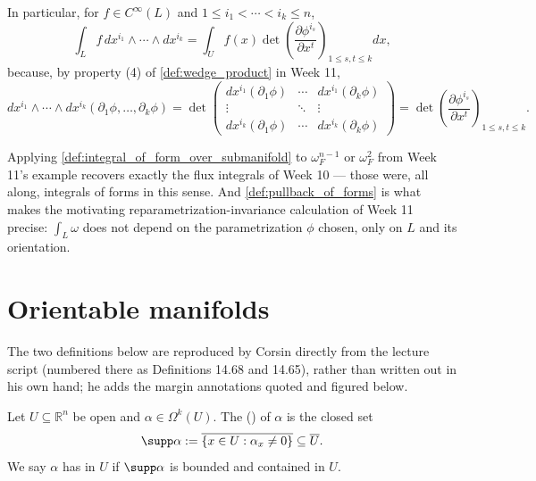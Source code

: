 In particular, for $f \in C^\infty(L)$ and $1\leq i_1<\cdots<i_k\leq n$,
\[\int_L f\,dx^{i_1}\wedge\cdots\wedge dx^{i_k} = \int_U f(x)\det\!\left(\frac{\partial
  \phi^{i_s}}{\partial x^t}\right)_{1\leq s,t\leq k} dx,\]
because, by property (4) of \cref{def:wedge_product} in Week 11,
\[dx^{i_1}\wedge\cdots\wedge dx^{i_k}(\partial_1\phi,\ldots,\partial_k\phi) = \det\!\left(
  \begin{smallmatrix} dx^{i_1}(\partial_1\phi) & \cdots & dx^{i_1}(\partial_k\phi) \\
  \vdots & \ddots & \vdots \\ dx^{i_k}(\partial_1\phi) & \cdots & dx^{i_k}(\partial_k\phi)
  \end{smallmatrix}\right) = \det\!\left(\frac{\partial\phi^{i_s}}{\partial x^t}\right)_{1\leq
  s,t\leq k}.\]

\begin{ainote}
Applying \cref{def:integral_of_form_over_submanifold} to $\omega_F^{n-1}$ or $\omega_F^2$ from
Week 11's example recovers exactly the flux integrals of Week 10 --- those were, all along,
integrals of forms in this sense. And \cref{def:pullback_of_forms} is what makes the
motivating reparametrization-invariance calculation of Week 11 precise: $\int_L \omega$ does
not depend on the parametrization $\phi$ chosen, only on $L$ and its orientation.
\end{ainote}

\section{Orientable manifolds}
\label{sec:orientable_manifolds}

\begin{ainote}
The two definitions below are reproduced by Corsin directly from the lecture script (numbered
there as Definitions 14.68 and 14.65), rather than written out in his own hand; he adds the
margin annotations quoted and figured below.
\end{ainote}

\begin{definition}
\label{def:support_of_k_form}
Let $U \subseteq \mathbb{R}^n$ be open and $\alpha \in \Omega^k(U)$. The 
() of $\alpha$ is the closed set
\[\supp\alpha := \overline{\{x\in U : \alpha_x \neq 0\}} \subseteq \overline{U}.\]
We say $\alpha$ has  in $U$ if $\supp\alpha$ is bounded and contained
in $U$.
\end{definition}

